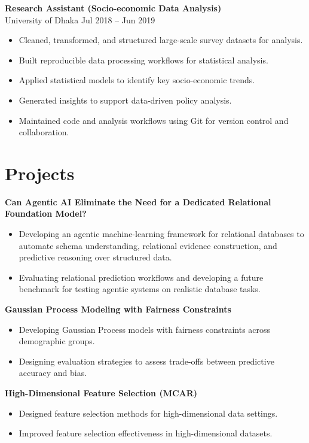 \documentclass[10pt, letterpaper]{article}
\begin{document}
\textbf{Research Assistant (Socio-economic Data Analysis)} \\
University of Dhaka \hfill Jul 2018 -- Jun 2019
\begin{itemize}
    \item Cleaned, transformed, and structured large-scale survey datasets for analysis.
    \item Built reproducible data processing workflows for statistical analysis.
    \item Applied statistical models to identify key socio-economic trends.
    \item Generated insights to support data-driven policy analysis.
    \item Maintained code and analysis workflows using Git for version control and collaboration.
\end{itemize}

    
    \section*{Projects}
    \textbf{Can Agentic AI Eliminate the Need for a Dedicated Relational Foundation Model?}
    \begin{itemize}
        \item Developing an agentic machine-learning framework for relational databases to automate schema understanding, relational evidence construction, and predictive reasoning over structured data.
        \item Evaluating relational prediction workflows and developing a future benchmark for testing agentic systems on realistic database tasks.
    \end{itemize}

    \textbf{Gaussian Process Modeling with Fairness Constraints} \\
    \begin{itemize}
    \item Developing Gaussian Process models with fairness constraints across demographic groups.
    \item Designing evaluation strategies to assess trade-offs between predictive accuracy and bias.
    \end{itemize}

    \textbf{High-Dimensional Feature Selection (MCAR)} \\
    \begin{itemize}
    \item Designed feature selection methods for high-dimensional data settings.
    \item Improved feature selection effectiveness in high-dimensional datasets.
\end{itemize}
\end{document}
